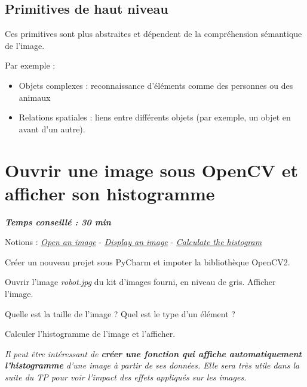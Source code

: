 \documentclass[a4paper,11pt,titlepage]{article} %
\begin{document}
\subsection{Primitives de haut niveau}

Ces primitives sont plus abstraites et dépendent de la compréhension sémantique de l'image. 

Par exemple :

\begin{itemize}
	\item Objets complexes : reconnaissance d'éléments comme des personnes ou des animaux
	\item Relations spatiales : liens entre différents objets (par exemple, un objet en avant d'un autre).
\end{itemize}




\newpage
\section{Ouvrir une image sous OpenCV et afficher son histogramme}

\begin{center} \textbf{\textit{Temps conseillé : 30 min}} \end{center}

\begin{mdframed}[style=sidebar,frametitle={}]
Notions : \href{https://iogs-lense-training.github.io/image-processing/contents/opencv.html#open-an-image
}{\textit{Open an image}} - \href{https://iogs-lense-training.github.io/image-processing/contents/opencv.html#display-an-image
}{\textit{Display an image}} - \href{https://iogs-lense-training.github.io/image-processing/contents/opencv.html#enhance-the-image-contrast-and-brightness}{\textit{Calculate the histogram}}
\end{mdframed}
 
\Manip Créer un nouveau projet sous PyCharm et impoter la bibliothèque OpenCV2.

\Manip Ouvrir l'image \textsl{robot.jpg} du kit d'images fourni, en niveau de gris. Afficher l'image.

\Quest Quelle est la taille de l'image ? Quel est le type d'un élément ?

\Manip Calculer l'histogramme de l'image et l'afficher.

\medskip

\textit{Il peut être intéressant de \textbf{créer une fonction qui affiche automatiquement l'histogramme} d'une image à partir de ses données. Elle sera très utile dans la suite du TP pour voir l'impact des effets appliqués sur les images.}
\end{document}
